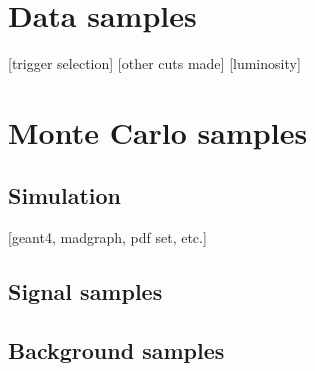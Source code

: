 \documentclass[../thesis.tex]{subfiles}
\begin{document}
\vspace{-1\baselineskip}

\section{Data samples}
\label{sec:data}
[trigger selection]
[other cuts made]
[luminosity]

\section{Monte Carlo samples}
\label{sec:montecarlo}
\subsection{Simulation}
[geant4, madgraph, pdf set, etc.]
\subsection{Signal samples}
\subsection{Background samples}
\end{document}

